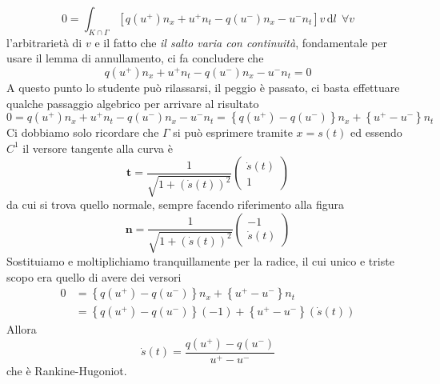 \documentclass[10pt,a4paper,twoside,openright]{book}
\newcommand{\de}{\,\mathrm d}
\newcommand{\dl}{\de l}
\begin{document}
\begin{dimostrazione}
	\begin{equation*}
		0=\int _{K\cap \Gamma }\left[ q\left(u^{+}\right) n_{x} +u^{+} n_{t} -q\left(u^{-}\right) n_{x} -u^{-} n_{t}\right] v\dl\ \ \forall v
	\end{equation*}
	l'arbitrarietà di $v$ e il fatto che \emph{il salto varia con continuità}, fondamentale per usare il lemma di annullamento, ci fa concludere che
	\begin{equation*}
		q\left(u^{+}\right) n_{x} +u^{+} n_{t} -q\left(u^{-}\right) n_{x} -u^{-} n_{t} =0
	\end{equation*}
	A questo punto lo studente può rilassarsi, il peggio è passato, ci basta effettuare qualche passaggio algebrico per arrivare al risultato
	\begin{equation*}
		0=q\left(u^{+}\right) n_{x} +u^{+} n_{t} -q\left(u^{-}\right) n_{x} -u^{-} n_{t} =\left\{q\left(u^{+}\right) -q\left(u^{-}\right)\right\} n_{x} +\left\{u^{+} -u^{-}\right\} n_{t}
	\end{equation*}
	Ci dobbiamo solo ricordare che $\Gamma $ si può esprimere tramite $x=s(t)$ ed essendo $C^{1}$ il versore tangente alla curva è
	\begin{equation*}
		\mathbf{t} =\frac{1}{\sqrt{1+(\dot{s}(t))^{2}}}
		\begin{pmatrix}
			\dot{s}(t) \\
			1           
		\end{pmatrix}
	\end{equation*}
	da cui si trova quello normale, sempre facendo riferimento alla figura
	\begin{equation*}
		\mathbf{n} =\frac{1}{\sqrt{1+(\dot{s}(t))^{2}}}
		\begin{pmatrix}
			-1          \\
			\dot{s}(t) 
		\end{pmatrix}
	\end{equation*}
	Sostituiamo e moltiplichiamo tranquillamente per la radice, il cui unico e triste scopo era quello di avere dei versori
	\begin{align*}
		0 & =\left\{q\left(u^{+}\right) -q\left(u^{-}\right)\right\} n_{x} +\left\{u^{+} -u^{-}\right\} n_{t}       \\
		  & =\left\{q\left(u^{+}\right) -q\left(u^{-}\right)\right\}(-1) +\left\{u^{+} -u^{-}\right\}(\dot{s}(t)) 
	\end{align*}
	Allora
	\begin{equation*}
		\dot{s}(t) =\frac{q\left(u^{+}\right) -q\left(u^{-}\right)}{u^{+} -u^{-}}
	\end{equation*}
	che è Rankine-Hugoniot.
\end{dimostrazione}
\end{document}
